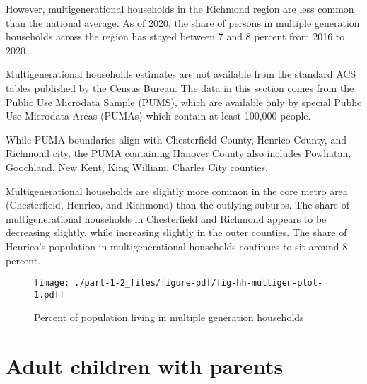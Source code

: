 \documentclass[
  letterpaper,
  DIV=11,
  numbers=noendperiod]{scrreprt}
\begin{document}
However, multigenerational households in the Richmond region are less
common than the national average. As of 2020, the share of persons in
multiple generation households across the region has stayed between 7
and 8 percent from 2016 to 2020.

\begin{tcolorbox}[enhanced jigsaw, colframe=quarto-callout-note-color-frame, arc=.35mm, bottomrule=.15mm, colbacktitle=quarto-callout-note-color!10!white, opacityback=0, left=2mm, rightrule=.15mm, title=\textcolor{quarto-callout-note-color}{\faInfo}\hspace{0.5em}{Note}, colback=white, coltitle=black, toptitle=1mm, leftrule=.75mm, titlerule=0mm, breakable, opacitybacktitle=0.6, toprule=.15mm, bottomtitle=1mm]

Multigenerational households estimates are not available from the
standard ACS tables published by the Census Bureau. The data in this
section comes from the Public Use Microdata Sample (PUMS), which are
available only by special Public Use Microdata Areas (PUMAs) which
contain at least 100,000 people.

While PUMA boundaries align with Chesterfield County, Henrico County,
and Richmond city, the PUMA containing Hanover County also includes
Powhatan, Goochland, New Kent, King William, Charles City counties.

\end{tcolorbox}

Multigenerational households are slightly more common in the core metro
area (Chesterfield, Henrico, and Richmond) than the outlying suburbs.
The share of multigenerational households in Chesterfield and Richmond
appears to be decreasing slightly, while increasing slightly in the
outer counties. The share of Henrico's population in multigenerational
households continues to sit around 8 percent.

\begin{figure}

{\centering \texttt{[image: ./part-1-2\_files/figure-pdf/fig-hh-multigen-plot-1.pdf]}

}

\caption{\label{fig-hh-multigen-plot}Percent of population living in
multiple generation households}

\end{figure}

\hypertarget{adult-children-with-parents}{%
\section{Adult children with
parents}\label{adult-children-with-parents}}
\end{document}
